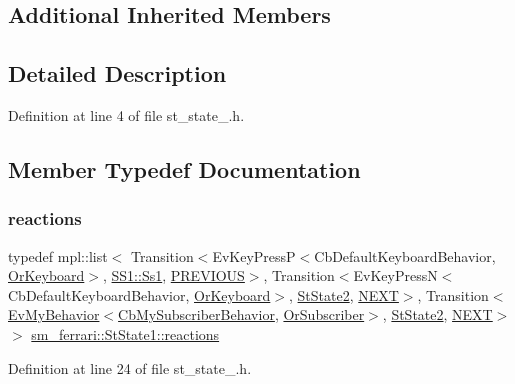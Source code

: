 \subsection*{Additional Inherited Members}


\subsection{Detailed Description}


Definition at line 4 of file st\+\_\+state\+\_.\+h.



\subsection{Member Typedef Documentation}
\mbox{\label{structsm__ferrari_1_1StState1_a274606ddafaf6bfbc62c424474b8d515}} 
\subsubsection{\texorpdfstring{reactions}{reactions}}
{\footnotesize\ttfamily typedef mpl\+::list$<$ Transition$<$Ev\+Key\+PressP$<$Cb\+Default\+Keyboard\+Behavior, \hyperlink{classsm__ferrari_1_1OrKeyboard}{Or\+Keyboard}$>$, \hyperlink{structsm__ferrari_1_1SS1_1_1Ss1}{S\+S1\+::\+Ss1}, \hyperlink{structsm__ferrari_1_1StState1_1_1PREVIOUS}{P\+R\+E\+V\+I\+O\+US}$>$, Transition$<$Ev\+Key\+PressN$<$Cb\+Default\+Keyboard\+Behavior, \hyperlink{classsm__ferrari_1_1OrKeyboard}{Or\+Keyboard}$>$, \hyperlink{structsm__ferrari_1_1StState2}{St\+State2}, \hyperlink{structsm__ferrari_1_1StState1_1_1NEXT}{N\+E\+XT}$>$, Transition$<$\hyperlink{structsm__ferrari_1_1cl__subscriber_1_1EvMyBehavior}{Ev\+My\+Behavior}$<$\hyperlink{classsm__ferrari_1_1cl__subscriber_1_1CbMySubscriberBehavior}{Cb\+My\+Subscriber\+Behavior}, \hyperlink{classsm__ferrari_1_1OrSubscriber}{Or\+Subscriber}$>$, \hyperlink{structsm__ferrari_1_1StState2}{St\+State2}, \hyperlink{structsm__ferrari_1_1StState1_1_1NEXT}{N\+E\+XT}$>$ $>$ \hyperlink{structsm__ferrari_1_1StState1_a274606ddafaf6bfbc62c424474b8d515}{sm\+\_\+ferrari\+::\+St\+State1\+::reactions}}



Definition at line 24 of file st\+\_\+state\+\_.\+h.



